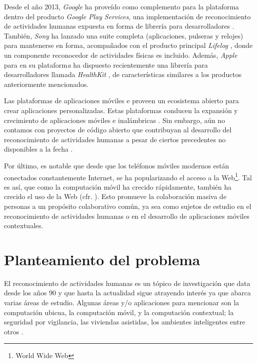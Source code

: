 Desde el año 2013, \emph{Google} ha proveído como complemento para
la plataforma \emph{ }\cite{Google2005a} dentro del
producto \emph{Google Play Services}, una implementación de reconocimiento
de actividades humanas expuesta en forma de librería para desarrolladores
\cite{Google2013l}. También, \emph{Sony} ha lanzado una suite completa
(aplicaciones, pulseras y relojes) para mantenerse en forma, acompañados
con el producto principal \emph{Lifelog} \cite{Sony2016l}, donde
un componente reconocedor de actividades físicas es incluido. Además,
\emph{Apple} para en su plataform\emph{a } \cite{Apple2007i}
ha dispuesto recientemente una librería para desarrolladores llamada
\emph{HealthKit} \cite{Apple2016h}, de características similares
a los productos anteriormente mencionados. 

Las plataformas de aplicaciones móviles \emph{} e \emph{}
proveen un ecosistema abierto para crear aplicaciones personalizadas.
Estas plataformas conducen la expansión y crecimiento de aplicaciones
móviles e inalámbricas \cite{Tanenbaum2010}. Sin embargo, aún no
contamos con proyectos de código abierto que contribuyan al desarrollo
del reconocimiento de actividades humanas a pesar de ciertos precedentes
no disponibles a la fecha \cite{Kwapisz2011,LaraLabrador2013}.

Por último, es notable que desde que los teléfonos móviles modernos
están conectados constantemente Internet, se ha popularizando el acceso
a la Web\footnote{World Wide Web}. Tal es así, que como la computación
móvil ha crecido rápidamente, también ha crecido el uso de la Web
(cfr. \cite{NYTimes2008iph}). Esto promueve la colaboración masiva
de personas a un propósito colaborativo común, ya sea como sujetos
de estudio en el reconocimiento de actividades humanas o en el desarrollo
de aplicaciones móviles contextuales.

\section{Planteamiento del problema}

\label{sec11:planteamiento}

El reconocimiento de actividades humanas es un tópico de investigación
que data desde los años 90 y que hasta la actualidad sigue atrayendo
interés ya que abarca varias áreas de estudio. Algunas áreas y/o aplicaciones
para mencionar son la computación ubicua, la computación móvil, y
la computación contextual; la seguridad por vigilancia, las viviendas
asistidas, los ambientes inteligentes entre otros \cite{Chen2012}. 

